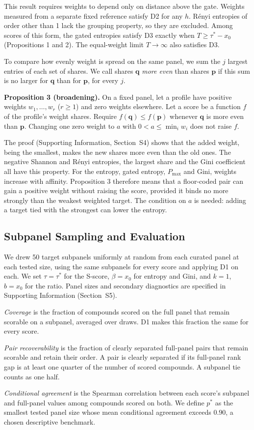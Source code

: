 This result requires weights to depend only on distance above the gate.
Weights measured from a separate fixed reference satisfy D2 for any $h$.
R\'enyi entropies of order other than 1 lack the grouping property, so they
are excluded. Among scores of this form, the gated entropies satisfy D3
exactly when $T \geq \tau^* - x_0$ (Propositions 1 and 2). The equal-weight
limit $T \to \infty$ also satisfies D3.

To compare how evenly weight is spread on the same panel, we sum the $j$
largest entries of each set of shares. We call shares $\mathbf{q}$
\emph{more even} than shares $\mathbf{p}$ if this sum is no larger for
$\mathbf{q}$ than for $\mathbf{p}$, for every $j$.

\textbf{Proposition 3 (broadening).} On a fixed panel, let a profile have
positive weights $w_1, \ldots, w_r$ ($r \geq 1$) and zero weights elsewhere.
Let a score be a function $f$ of the profile's weight shares. Require
$f(\mathbf{q}) \leq f(\mathbf{p})$ whenever $\mathbf{q}$ is more even than
$\mathbf{p}$. Changing one zero weight to $a$ with $0 < a \leq \min_i w_i$
does not raise $f$.

The proof (Supporting Information, Section~S4) shows that the added weight,
being the smallest, makes the new shares more even than the old ones. The
negative Shannon and R\'enyi entropies, the largest share and the Gini
coefficient all have this property. For the entropy, gated entropy,
$P_{\max}$ and Gini, weights increase with affinity. Proposition 3 therefore
means that a floor-coded pair can gain a positive weight without raising
the score, provided it binds no more strongly than the weakest weighted
target. The condition on $a$ is needed: adding a target tied with the
strongest can lower the entropy.


\subsection{Subpanel Sampling and Evaluation}
\label{sec:methods:recovery}

We drew 50 target subpanels uniformly at random from each curated panel at
each tested size, using the same subpanels for every score and applying D1
on each. We set
$\tau = \tau^*$ for the S-score, $\beta = x_0$ for entropy and Gini, and
$k = 1$, $b = x_0$ for the ratio. Panel sizes and secondary diagnostics are
specified in Supporting Information (Section~S5).

\emph{Coverage} is the fraction of compounds scored on the full panel that
remain scorable on a subpanel, averaged over draws. D1 makes this fraction
the same for every score.

\emph{Pair recoverability} is the fraction of clearly separated full-panel
pairs that remain scorable and retain their order. A pair is clearly
separated if its full-panel rank gap is at least one quarter of the number
of scored compounds. A subpanel tie counts as one half.

\emph{Conditional agreement} is the Spearman correlation between each score's
subpanel and full-panel values among compounds scored on both. We define
$p^*$ as the smallest tested panel size whose mean conditional agreement
exceeds $0.90$, a chosen descriptive benchmark.
